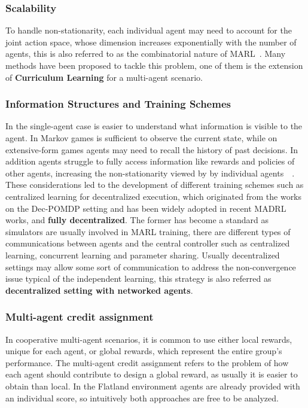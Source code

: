 \documentclass[11pt, a4paper, hidelinks]{report}
\begin{document}
\subsubsection{Scalability}

To handle non-stationarity, each individual agent may need to account for the joint action space, whose dimension increases exponentially with the number of agents, this is  also referred to as the combinatorial nature of MARL\@~\citep{zhang2019multiagent}.
Many methods have been proposed to tackle this problem, one of them is the extension of \textbf{Curriculum Learning} for a multi-agent scenario.

\subsubsection{Information Structures and Training Schemes}
In the single-agent case is easier to understand what information is visible to the agent.
In Markov games is sufficient to observe the current state, while on extensive-form games agents may need to recall the history of past decisions.
In addition agents struggle to fully access information like rewards and policies of other agents, increasing the non-stationarity viewed by by individual agents~\citep{Nguyen-2020}~\citep{zhang2019multiagent}.
These considerations led to the development of different training schemes such as centralized learning for decentralized execution, which originated from the works on the Dec-POMDP setting and has been widely adopted in recent MADRL works, and \textbf{fully decentralized}.
The former has become a standard as simulators are usually involved in MARL training, there are different types of communications between agents and the central controller such as centralized learning, concurrent learning and parameter sharing\citep{Nguyen-2020}.
Usually decentralized settings may allow some sort of communication to address the non-convergence issue typical of the independent learning, this strategy is also referred as \textbf{decentralized setting with networked agents}.

\subsubsection{Multi-agent credit assignment}\label{subsubsec:multi-agent-credit-assignment}
In cooperative multi-agent scenarios, it is common to use either local rewards, unique for each agent, or global rewards, which represent the entire group’s performance.
The multi-agent credit assignment refers to the problem of how each agent should contribute to design a global reward, as usually it is easier to obtain than local.
In the Flatland environment agents are already provided with an individual score, so intuitively both approaches are free to be analyzed.
\end{document}

